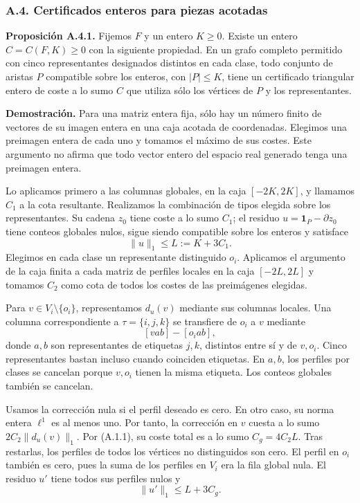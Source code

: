 \documentclass[spanish,11pt,a4paper]{article}
\begin{document}
\subsubsection{A.4. Certificados enteros para piezas acotadas}\label{a.4.-certificados-enteros-para-piezas-acotadas}

\textbf{Proposición A.4.1.} Fijemos \(F\) y un entero \(K\ge0\). Existe un entero \(C=C(F,K)\ge0\) con la siguiente propiedad. En un grafo completo permitido con cinco representantes designados distintos en cada clase, todo conjunto de aristas \(P\) compatible sobre los enteros, con \(|P|\le K\), tiene un certificado triangular entero de coste a lo sumo \(C\) que utiliza sólo los vértices de \(P\) y los representantes.

\textbf{Demostración.} Para una matriz entera fija, sólo hay un número finito de vectores de su imagen entera en una caja acotada de coordenadas. Elegimos una preimagen entera de cada uno y tomamos el máximo de sus costes. Este argumento no afirma que todo vector entero del espacio real generado tenga una preimagen entera.

Lo aplicamos primero a las columnas globales, en la caja \([-2K,2K]\), y llamamos \(C_1\) a la cota resultante. Realizamos la combinación de tipos elegida sobre los representantes. Su cadena \(z_0\) tiene coste a lo sumo \(C_1\); el residuo \(u=\mathbf1_P-\partial z_0\) tiene conteos globales nulos, sigue siendo compatible sobre los enteros y satisface \[\|u\|_1\le L:=K+3C_1.\] Elegimos en cada clase un representante distinguido \(o_i\). Aplicamos el argumento de la caja finita a cada matriz de perfiles locales en la caja \([-2L,2L]\) y tomamos \(C_2\) como cota de todos los costes de las preimágenes elegidas.

Para \(v\in V_i\setminus\{o_i\}\), representamos \(d_u(v)\) mediante sus columnas locales. Una columna correspondiente a \(\tau=\{i,j,k\}\) se transfiere de \(o_i\) a \(v\) mediante \[[vab]-[o_iab],
\tag{A.4.1}\] donde \(a,b\) son representantes de etiquetas \(j,k\), distintos entre sí y de \(v,o_i\). Cinco representantes bastan incluso cuando coinciden etiquetas. En \(a,b\), los perfiles por clases se cancelan porque \(v,o_i\) tienen la misma etiqueta. Los conteos globales también se cancelan.

Usamos la corrección nula si el perfil deseado es cero. En otro caso, su norma entera \(\ell^1\) es al menos uno. Por tanto, la corrección en \(v\) cuesta a lo sumo \(2C_2\|d_u(v)\|_1\). Por (A.1.1), su coste total es a lo sumo \(C_g=4C_2L\). Tras restarlas, los perfiles de todos los vértices no distinguidos son cero. El perfil en \(o_i\) también es cero, pues la suma de los perfiles en \(V_i\) era la fila global nula. El residuo \(u'\) tiene todos sus perfiles nulos y \[\|u'\|_1\le L+3C_g.
\tag{A.4.2}\]
\end{document}

